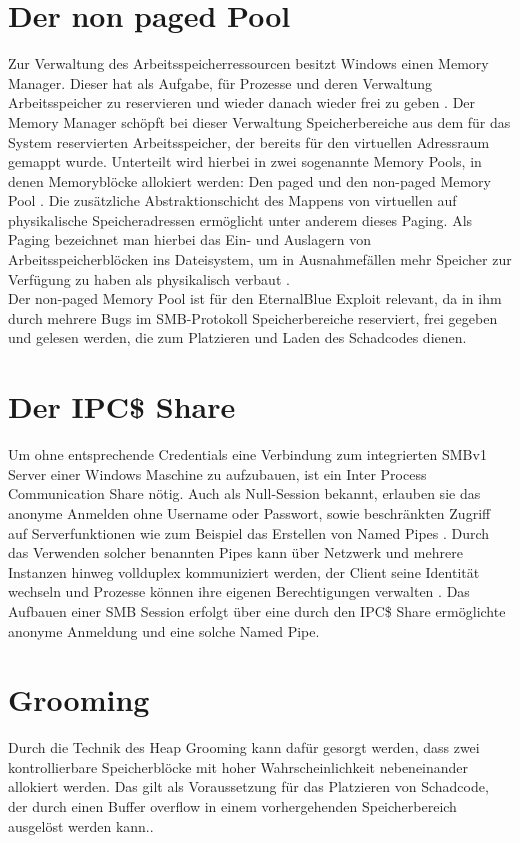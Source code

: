 \documentclass[DIV=12,headings=normal,pdftex,headinclude=false,footinclude=false,final]{scrreprt}
\begin{document}
\section{Der non paged Pool}
Zur Verwaltung des Arbeitsspeicherressourcen besitzt Windows einen Memory Manager. Dieser hat als Aufgabe, für Prozesse und deren Verwaltung Arbeitsspeicher zu reservieren und wieder danach wieder frei zu geben \cite{Medium:ExpBible}. Der Memory Manager schöpft bei dieser Verwaltung Speicherbereiche aus dem für das System reservierten Arbeitsspeicher, der bereits für den virtuellen Adressraum gemappt wurde. Unterteilt wird hierbei in zwei sogenannte Memory Pools, in denen Memoryblöcke allokiert werden: Den paged und den non-paged Memory Pool \cite{MS:MemPools}. Die zusätzliche Abstraktionschicht des Mappens von virtuellen auf physikalische Speicheradressen ermöglicht unter anderem dieses Paging. Als Paging bezeichnet man hierbei das Ein- und Auslagern von Arbeitsspeicherblöcken ins Dateisystem, um in Ausnahmefällen mehr Speicher zur Verfügung zu haben als physikalisch verbaut \cite{CompWeek:Paging}.\\
Der non-paged Memory Pool ist für den EternalBlue Exploit relevant, da in ihm durch mehrere Bugs im SMB-Protokoll Speicherbereiche reserviert, frei gegeben und gelesen werden, die zum Platzieren und Laden des Schadcodes dienen.

\section{Der IPC\$ Share}
Um ohne entsprechende Credentials eine Verbindung zum integrierten SMBv1 Server einer Windows Maschine zu aufzubauen, ist ein Inter Process Communication Share nötig. Auch als Null-Session bekannt, erlauben sie das anonyme Anmelden ohne Username oder Passwort, sowie beschränkten Zugriff auf Serverfunktionen wie zum Beispiel das Erstellen von Named Pipes \cite{MS:IPC}. Durch das Verwenden solcher benannten Pipes kann über Netzwerk und mehrere Instanzen hinweg vollduplex kommuniziert werden, der Client seine Identität wechseln und Prozesse können ihre eigenen Berechtigungen verwalten \cite{MS:NP}. Das Aufbauen einer SMB Session erfolgt über eine durch den IPC\$ Share ermöglichte anonyme Anmeldung und eine solche Named Pipe.

\section{Grooming}
Durch die Technik des Heap Grooming kann dafür gesorgt werden, dass zwei kontrollierbare Speicherblöcke mit hoher Wahrscheinlichkeit nebeneinander allokiert werden. Das gilt als Voraussetzung für das Platzieren von Schadcode, der durch einen Buffer overflow in einem vorhergehenden Speicherbereich ausgelöst werden kann.\cite{ARC}.
\end{document}
